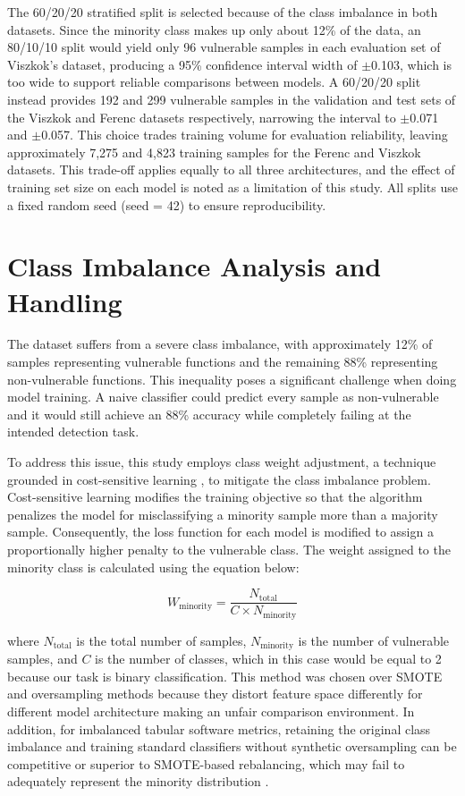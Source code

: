 The 60/20/20 stratified split is selected because of the class imbalance in both datasets. Since the minority class makes up only about 12\% of the data, an 80/10/10 split would yield only 96 vulnerable samples in each evaluation set of Viszkok’s dataset, producing a 95\% confidence interval width of $\pm$0.103, which is too wide to support reliable comparisons between models. A 60/20/20 split instead provides 192 and 299 vulnerable samples in the validation and test sets of the Viszkok and Ferenc datasets respectively, narrowing the interval to $\pm$0.071 and $\pm$0.057. This choice trades training volume for evaluation reliability, leaving approximately 7,275 and 4,823 training samples for the Ferenc and Viszkok datasets. This trade-off applies equally to all three architectures, and the effect of training set size on each model is noted as a limitation of this study. All splits use a fixed random seed (seed = 42) to ensure reproducibility.


\section{Class Imbalance Analysis and Handling}

The dataset suffers from a severe class imbalance, with approximately 12\% of samples representing vulnerable functions and the remaining 88\% representing non-vulnerable functions. This inequality poses a significant challenge when doing model training. A naive classifier could predict every sample as non-vulnerable and it would still achieve an 88\% accuracy while completely failing at the intended detection task.

To address this issue, this study employs class weight adjustment, a technique grounded in cost-sensitive learning \citep{elkan_foundations_nodate}, to mitigate the class imbalance problem. Cost-sensitive learning modifies the training objective so that the algorithm penalizes the model for misclassifying a minority sample more than a majority sample. Consequently, the loss function for each model is modified to assign a proportionally higher penalty to the vulnerable class. The weight assigned to the minority class is calculated using the equation below:


\begin{equation}
  W_{\text{minority}} = \frac{N_{\text{total}}}{C \times N_{\text{minority}}}
  \label{eq:minority-weight}
\end{equation}

where \(N_{\text{total}}\) is the total number of samples, \(N_{\text{minority}}\) is the number of vulnerable samples, and \(C\) is the number of classes, which in this case would be equal to 2 because our task is binary classification. This method was chosen over SMOTE and oversampling methods because they distort feature space differently for different model architecture making an unfair comparison environment. In addition, for imbalanced tabular software metrics, retaining the original class imbalance and training standard classifiers without synthetic oversampling can be competitive or superior to SMOTE-based rebalancing, which may fail to adequately represent the minority distribution \citep{sakho_we_2026}.

